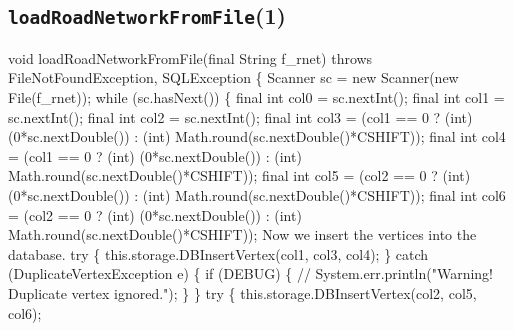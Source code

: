 \subsection{\texttt{loadRoadNetworkFromFile}(1)}
\nwenddocs{}\endmoddef{}
void loadRoadNetworkFromFile(final String f_rnet) throws FileNotFoundException, SQLException \{
  Scanner sc = new Scanner(new File(f_rnet));
  while (sc.hasNext()) \{
\eatline
{}\nwendcode{}
\nwenddocs{}\plusendmoddef
final int col0 = sc.nextInt();
final int col1 = sc.nextInt();
final int col2 = sc.nextInt();
final int col3 = (col1 == 0 ? (int) (0*sc.nextDouble()) : (int) Math.round(sc.nextDouble()*CSHIFT));
final int col4 = (col1 == 0 ? (int) (0*sc.nextDouble()) : (int) Math.round(sc.nextDouble()*CSHIFT));
final int col5 = (col2 == 0 ? (int) (0*sc.nextDouble()) : (int) Math.round(sc.nextDouble()*CSHIFT));
final int col6 = (col2 == 0 ? (int) (0*sc.nextDouble()) : (int) Math.round(sc.nextDouble()*CSHIFT));
\nwendcode{}\nwdocspar
{\small Now we insert the vertices into the database.}
\nwenddocs{}\plusendmoddef
try \{
  this.storage.DBInsertVertex(col1, col3, col4);
\} catch (DuplicateVertexException e) \{
  if (DEBUG) \{
    // System.err.println("Warning! Duplicate vertex ignored.");
  \}
\}
try \{
  this.storage.DBInsertVertex(col2, col5, col6);
